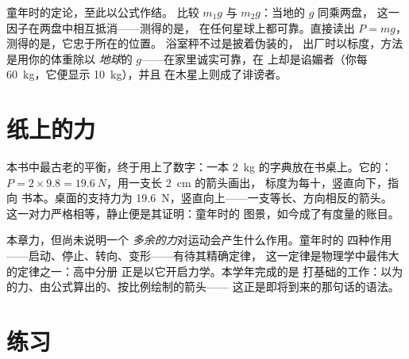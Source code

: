 \begin{remark}[两种秤的最终评判]\label{rem:g9:weight-vs-mass:scales}
童年时的定论，至此以公式作结。
比较 $m_1 g$ 与 $m_2 g$：当地的 $g$ 同乘两盘，
这一因子在两盘中相互抵消——测得的是\emph{}，
在任何星球上都可靠。直接读出 $P = m g$，
测得的是\emph{}，它忠于所在的位置。
浴室秤不过是披着伪装的，
出厂时以标度，方法是用你的体重除以
\emph{地球}的 $g$——在家里诚实可靠，在
上却是谄媚者（你每 \qty{60}{kg}，它便显示 \qty{10}{kg}），并且
在木星上则成了诽谤者。
\end{remark}

\section{纸上的力}

\begin{example}\label{ex:g9:weight-vs-mass:book}
本书中最古老的平衡，终于用上了数字：一本
\qty{2}{kg} 的字典放在书桌上。它的：$P = 2
\times 9.8 = \qty{19.6}{N}$，用一支长 \qty{2}{cm} 的箭头画出，
标度为每十，竖直向下，指向
书本。桌面的支持力为
\qty{19.6}{N}，竖直向上——一支等长、方向相反的箭头。
这一对力严格相等，静止便是其证明：童年时的
图景，如今成了有度量的账目。
\end{example}

\begin{remark}\label{rem:g9:weight-vs-mass:dynamics}
本章力，但尚未说明一个
\emph{多余的力}对运动会产生什么作用。童年时的
四种作用——启动、停止、转向、变形——有待其精确定律，
这一定律是物理学中最伟大的定律之一：高中分册
正是以它开启力学。本学年完成的是
打基础的工作：以为的力、由公式算出的、按比例绘制的箭头——
这正是即将到来的那句话的语法。
\end{remark}

\section{练习}

